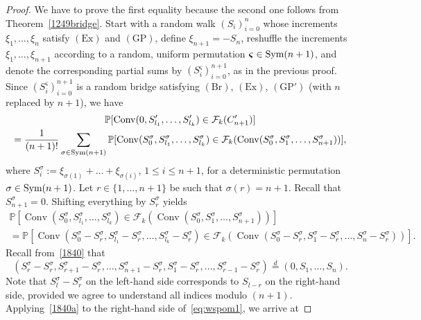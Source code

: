 \documentclass[12pt, reqno]{amsart}
\theoremstyle{plain}
\theoremstyle{definition}
\theoremstyle{remark}
\begin{document}
\begin{proof}
We have to prove the first equality because the second one follows from Theorem~\ref{1249bridge}.  Start with a random walk $(S_i)_{i=0}^n$ whose increments $\xi_1,\ldots,\xi_n$ satisfy $(\text{Ex})$ and $(\text{GP})$, define $\xi_{n+1} = -S_n$, reshuffle the increments $\xi_1,\ldots,\xi_{n+1}$ according to a random, uniform permutation ${{\boldsymbol{\varsigma}}}\in {\text{\rm Sym}}(n+1)$, and denote the corresponding partial sums by $(S_{i}^{{\boldsymbol{\varsigma}}})_{i=0}^{n+1}$, as in the previous proof. Since $(S_{i}^{{\boldsymbol{\varsigma}}})_{i=0}^{n+1}$ is a random bridge satisfying $(\text{Br})$, $(\text{Ex})$, $(\text{GP}')$ (with $n$ replaced by $n+1$), we have
\begin{multline}\label{eq:shift_faces}
{\mathbb{P}}[{\mathop{\mathrm{Conv}}\nolimits}(0, S_{l_1}',\ldots, S_{l_{k}}')\in {\mathcal{F}}_k(C_{n+1}')]
\\=
\frac 1 {(n+1)!} \sum_{\sigma\in {\text{\rm Sym}}(n+1)}
{\mathbb{P}}[{\mathop{\mathrm{Conv}}\nolimits} (S_0^{\sigma}, S_{l_1}^\sigma,\ldots, S_{l_{k}}^\sigma) \in {\mathcal{F}}_k({\mathop{\mathrm{Conv}}\nolimits} (S_0^{\sigma},S_1^{\sigma}, \ldots, S_{n+1}^{\sigma}))],
\end{multline}
where $S^{\sigma}_i:=\xi_{\sigma(1)}+\dots+\xi_{\sigma(i)}$, $1\leq i \leq n+1$, for a deterministic permutation $\sigma\in {\text{\rm Sym}}(n+1)$. Let $r\in \{1,\ldots,n+1\}$ be such that $\sigma(r) = n+1$. Recall that $S_{n+1}^\sigma = 0$. Shifting everything by $S_r^{\sigma}$ yields
\begin{multline}\label{eq:wspom1}
{\mathbb{P}}[{\mathop{\mathrm{Conv}}\nolimits} (S_0^{\sigma}, S_{l_1}^\sigma,\ldots, S_{l_{k}}^\sigma) \in {\mathcal{F}}_k({\mathop{\mathrm{Conv}}\nolimits} (S_0^{\sigma},S_1^{\sigma}, \ldots, S_{n+1}^{\sigma}))]
\\=
{\mathbb{P}}[{\mathop{\mathrm{Conv}}\nolimits} (S_0^{\sigma}-S_r^{\sigma}, S_{l_1}^\sigma-S_r^{\sigma},\ldots, S_{l_{k}}^\sigma-S_r^{\sigma})
\in {\mathcal{F}}_k({\mathop{\mathrm{Conv}}\nolimits} (S_0^{\sigma}-S_r^{\sigma},S_1^{\sigma}-S_r^{\sigma}, \ldots, S_{n}^{\sigma}-S_r^{\sigma}))].
\end{multline}
Recall from~\eqref{1840} that
\begin{equation}\label{1840a}
(S_r^{\sigma}- S_r^{\sigma},S^\sigma_{r+1}-S^\sigma_{r},\dots,S^\sigma_{n+1}-S^\sigma_{r},S^\sigma_1-S^\sigma_{r},\dots,S^\sigma_{r-1}-S^\sigma_{r})
{\stackrel{d}{=}}(0,S_1,\dots,S_n).
\end{equation}
Note that $S_l^\sigma-S_r^{\sigma}$ on the left-hand side corresponds to $S_{l-r}$ on the right-hand side, provided we agree to understand all indices modulo $(n+1)$.   Applying~\eqref{1840a} to the right-hand side of~\eqref{eq:wspom1},  we arrive at

\end{proof}
\end{document}
